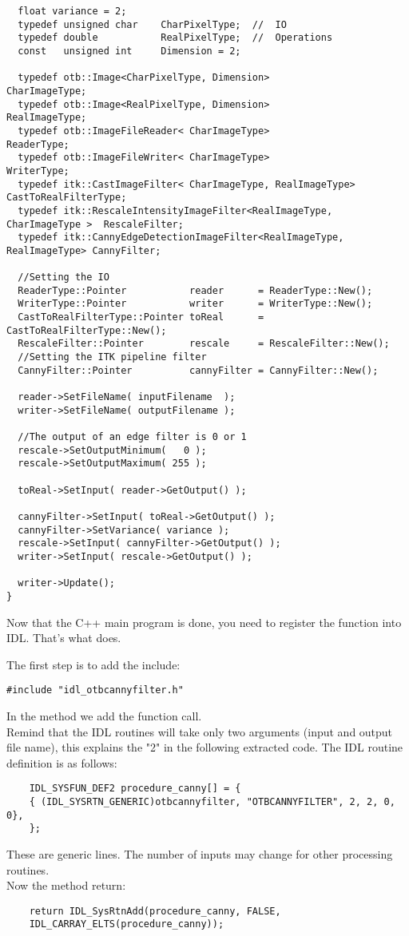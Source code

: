 \begin{verbatim}
  float variance = 2;
  typedef unsigned char    CharPixelType;  //  IO
  typedef double           RealPixelType;  //  Operations
  const   unsigned int     Dimension = 2;
  
  typedef otb::Image<CharPixelType, Dimension>                             CharImageType;
  typedef otb::Image<RealPixelType, Dimension>                             RealImageType;
  typedef otb::ImageFileReader< CharImageType>                             ReaderType;
  typedef otb::ImageFileWriter< CharImageType>                             WriterType;
  typedef itk::CastImageFilter< CharImageType, RealImageType>              CastToRealFilterType;
  typedef itk::RescaleIntensityImageFilter<RealImageType, CharImageType >  RescaleFilter;
  typedef itk::CannyEdgeDetectionImageFilter<RealImageType, RealImageType> CannyFilter;
  
  //Setting the IO
  ReaderType::Pointer           reader      = ReaderType::New();
  WriterType::Pointer           writer      = WriterType::New();
  CastToRealFilterType::Pointer toReal      = CastToRealFilterType::New();
  RescaleFilter::Pointer        rescale     = RescaleFilter::New();
  //Setting the ITK pipeline filter
  CannyFilter::Pointer          cannyFilter = CannyFilter::New();
  
  reader->SetFileName( inputFilename  );
  writer->SetFileName( outputFilename );
  
  //The output of an edge filter is 0 or 1
  rescale->SetOutputMinimum(   0 );
  rescale->SetOutputMaximum( 255 );
  
  toReal->SetInput( reader->GetOutput() );
  
  cannyFilter->SetInput( toReal->GetOutput() );
  cannyFilter->SetVariance( variance );
  rescale->SetInput( cannyFilter->GetOutput() );
  writer->SetInput( rescale->GetOutput() );
  
  writer->Update();
}
\end{verbatim}
Now that the C++ main program is done, you need to register the function into IDL. That's what  does.

The first step is to add the include:
\begin{verbatim}
#include "idl_otbcannyfilter.h"
\end{verbatim}
In the  method we add the function call.\\
Remind that the IDL routines will take only two arguments (input and
output file name), this explains the "2" in the following extracted
code. The IDL routine definition is as follows:
\begin{verbatim}
	IDL_SYSFUN_DEF2 procedure_canny[] = {  
	{ (IDL_SYSRTN_GENERIC)otbcannyfilter, "OTBCANNYFILTER", 2, 2, 0, 0},  
	}; 
\end{verbatim}
These are generic lines. The number of inputs may change for other
processing routines.\\
Now the method return:
\begin{verbatim}
    return IDL_SysRtnAdd(procedure_canny, FALSE,   
	IDL_CARRAY_ELTS(procedure_canny));
\end{verbatim}

